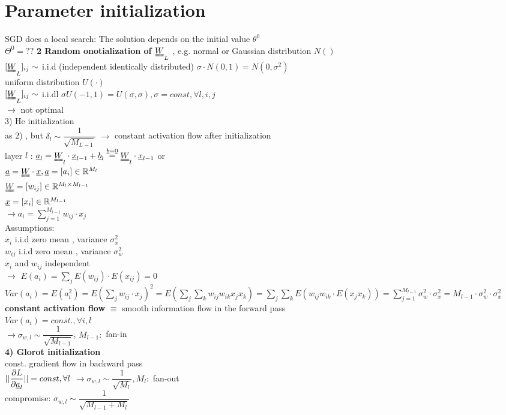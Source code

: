 \section{Parameter initialization}	
SGD does a local search: The solution depends on the initial value $  \theta ^0 $ \\
$  \Theta ^0 = ?? $
\textbf{2 Random onotialization of $ \W_L $} , e.g.
\textbullet normal or Gaussian distribution $ N() $\\
$ [ \W_L ]_{ij} \sim $ i.i.d (independent identically distributed) $  \sigma \cdot N(0,1) = N (0, \sigma^2)$\\
\textbullet uniform distribution $  U(\cdot) $ \\
$  [\W_L]_{ij} \sim  $ i.i.dl $  \sigma U(-1,1 ) = U(\sigma, \sigma) , \sigma = const, \forall l,i,j $ \\
$ \rightarrow $ not optimal \\
3) He initialization \\
as 2) , but $ \delta_l \sim \dfrac{1}{\sqrt{M_{L-1}}} $  $ \rightarrow $ constant activation flow after initialization \\
layer $  l $ : $ \a_l = \W_l \cdot \x _{l-1} + \b_{l} \overset {\b = \underline{0}}{=} \W_l \cdot \x_{l-1} $ or \\
$  \a = \W \cdot \x , \\
\a = [a_i] \in \R ^{M_l} $\\
$  \W = [w_{ij}] \in \R^{M_l \times M_{l-1}} $\\
$  {\underline x} = [x_i ] \in \mathbb R^{M_{l-1}} $\\
	$ \rightarrow  a_i = \sum_{j=1}^{M_{l-1}} w_{ij} \cdot x_j$\\
Assumptions:\\
\textbullet $ x_i  $ i.i.d zero mean , variance $  \sigma_x^2 $ \\
\textbullet $  w_{ij}  $  i.i.d zero mean , variance $  \sigma_w^2 $ \\
\textbullet $  x_i  $ and $  w_{ij} $ independent \\
$ \rightarrow $ \textbullet $  E(a_i) = \sum_{j}^{} E(w_{ij}) \cdot E(x _{ij} ) = 0$\\
\textbullet $  Var(a_i)  = E(a_i^2) = E (\sum_j w_{ij} \cdot x_j )^2 = E(\sum_j \sum_k w_{ij} w_{ik} x_{j} x_{k} ) = \sum_j \sum_k E(w_{ij} w_{ik} \cdot E(x_j x_k))  = \sum_{j=1}^{M_{l-1}} \sigma_w^2 \cdot \sigma_x^2 = M_{l-1} \cdot  \sigma_w^2 \cdot \sigma_x^2 $\\
\textbf{constant activation flow } $  \equiv  $ smooth information flow in the forward pass \\
$ Var (a_i) = const. , \forall i,l  $\\
$ \rightarrow \sigma_{w,l} \sim \dfrac{1}{\sqrt{M_{l-1}}}$, $ M_{l-1}:  $ fan-in\\
\textbf{4) Glorot initialization }\\
const. gradient flow in backward pass \\
$ ||  \dfrac{\partial L }{\partial {\underline a}_l}|| = const, \forall l$ $ \rightarrow  \sigma_{w,l} \sim \dfrac{1}{\sqrt{M_l}}, M_l:$ fan-out\\
compromise: $  \sigma_{w,l} \sim \dfrac{1}{\sqrt{M_{l-1} + M_l}} $
